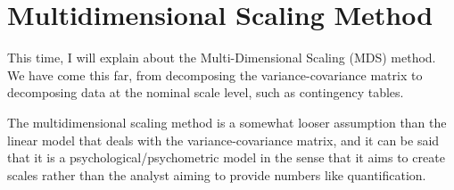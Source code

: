 \documentclass{ltjsbook}
\begin{document}
\chapter{Multidimensional Scaling Method}
\label{x15_MDS}
This time, I will explain about the Multi-Dimensional Scaling (MDS) method.
We have come this far, from decomposing the variance-covariance matrix to decomposing data at the nominal scale level, such as contingency tables.

The multidimensional scaling method is a somewhat looser assumption than the linear model that deals with the variance-covariance matrix, and it can be said that it is a psychological/psychometric model in the sense that it aims to create scales rather than the analyst aiming to provide numbers like quantification.
\end{document}
